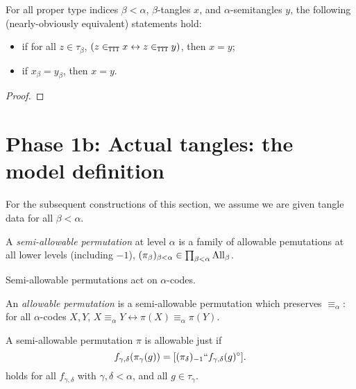 \begin{theorem}
\label {thm:extensionality}
\leanok
For all proper type indices $\beta < \alpha$, $\beta$-tangles $x$, and $\alpha$-semitangles $y$, the following (nearly-obviously equivalent) statements hold:
\begin{itemize}
  \item if for all $z \in \tau_\beta$, $(z \in_{\tt TTT} x \leftrightarrow z \in_{\tt TTT} y)$, then $x=y$;
  \item if $x_\beta = y_\beta$, then $x=y$.
\end{itemize}
\end{theorem}
\begin{proof}\leanok\end{proof}

\section{Phase 1b: Actual tangles: the model definition}

  For the subsequent constructions of this section, we assume we are given tangle data for all $\beta < \alpha$.

\begin{definition}
\label {def:semiallowable-perm}
\leanok
{}
  A \emph{semi-allowable permutation} at level $\alpha$ is a family of allowable pemutations at all lower levels (including $-1$), $(\pi_\beta)_{\beta < \alpha} \in \prod_{\beta < \alpha} \mathrm{All}_\beta$.
\end{definition}

\begin{definition}
\label{def:code-action}
\leanok
Semi-allowable permutations act on $\alpha$-codes.
\end{definition}

\begin{definition}
  \label{def:allowable-perm}
  \leanok
  An \emph{allowable permutation} is a semi-allowable permutation which preserves $\equiv_\alpha$: for all $\alpha$-codes $X,Y$, $X \equiv_\alpha Y \leftrightarrow \pi(X) \equiv_\alpha \pi(Y)$.
\end{definition}

\begin{lemma}
\label {lem:coherence-unpacked}
A semi-allowable permutation $\pi$ is allowable just if
$$f_{\gamma,\delta}(\pi_\gamma(g)) = [(\pi_\delta)_{-1}``f_{\gamma,\delta}(g)^\circ].$$
holds for all $f_{\gamma,\delta}$ with $\gamma,\delta<\alpha$, and all $g \in \tau_\gamma$.
\end{lemma}

